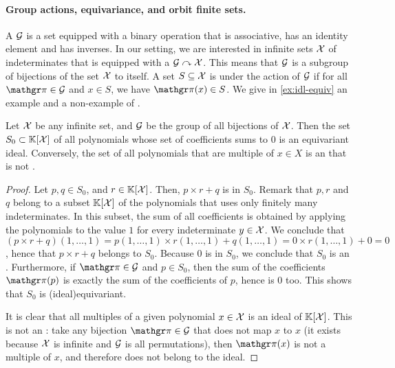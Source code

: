 \paragraph{Group actions, equivariance, and orbit finite sets.}  \AP A
 $\mathcal{G}$ is a set equipped with a binary operation that is
associative, has an identity element and has inverses.
In our setting, we are
interested in infinite sets $\mathcal{X}$ of indeterminates that is equipped with a
 $\mathcal{G} \curvearrowright \mathcal{X}$.
This means that $\mathcal{G}$ is a subgroup of bijections of the set $\mathcal{X}$ to itself.
A set $S \subseteq \mathcal{X}$ is  under the action of
$\mathcal{G}$ if for all $\gelem \in \group$ and $x \in S$, we have $\gelem(x)
\in S$. We give in \cref{ex:idl-equiv} an example and a non-example
of .

\begin{example}
    \label{ex:idl-equiv}
    Let $\mathcal{X}$ be any infinite set, and $\mathcal{G}$ be the 
    group of all bijections of $\mathcal{X}$. 
    Then the set $S_0 \subset \mathbb{K}[\mathcal{X}]$ of all polynomials 
    whose set of coefficients sums to $0$ is an equivariant ideal.
    Conversely, the set of all polynomials that are multiple
    of $x \in X$ is an  that is not .
\end{example}
\begin{proof}
    Let $p,q\in S_0$, and $r \in \mathbb{K}[\mathcal{X}]$.
    Then, $p \times r + q$ is in $S_0$. Remark that 
    $p,r$ and $q$ belong to a subset $\mathbb{K}[\mathcal{X}]$ of the 
    polynomials that uses only finitely many indeterminates.
    In this subset, the sum of all coefficients is obtained
    by applying the polynomials to the value $1$ for every indeterminate
    $y \in \mathcal{X}$. We conclude that
    $(p \times r + q)(1,\dots, 1) 
    = p(1,\dots,1) \times r(1,\dots,1) + q(1,\dots,1)
    = 0 \times r(1, \dots, 1) + 0 = 0$, hence that
    $p \times r + q$ belongs to $S_0$. 
    Because $0$ is in $S_0$, we conclude that $S_0$ is an .
    Furthermore, if $\gelem \in \group$ and $p \in S_0$, then
    the sum of the coefficients $\gelem(p)$ is exactly
    the sum of the coefficients of $p$, hence is $0$ too.
    This shows that $S_0$ is \kl(ideal){equivariant}.

    It is clear that all multiples of a given polynomial $x \in \mathcal{X}$
    is an ideal of $\mathbb{K}[\mathcal{X}]$. This is not an :
    take any bijection $\gelem \in \group$ that does not map $x$ to $x$ (it
    exists because $\mathcal{X}$ is infinite and $\mathcal{G}$ is all permutations),
    then $\gelem(x)$ is not a multiple of $x$, and therefore does 
    not belong to the ideal.
\end{proof}

